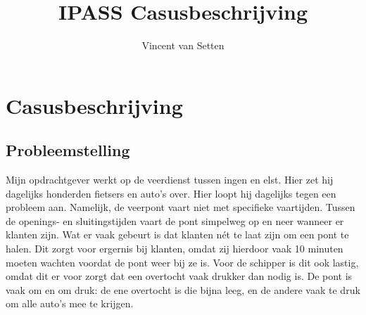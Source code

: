 \documentclass[11pt]{article}
\title{IPASS Casusbeschrijving}
\author{Vincent van Setten}
\begin{document}
\section{Casusbeschrijving}
\subsection{Probleemstelling}
Mijn opdrachtgever werkt op de veerdienst tussen ingen en elst. Hier zet hij dagelijks
honderden fietsers en auto's over. Hier loopt hij dagelijks tegen een probleem aan.
Namelijk, de veerpont vaart niet met specifieke vaartijden. Tussen de openings- en
sluitingstijden vaart de pont simpelweg op en neer wanneer er klanten zijn. Wat er vaak
gebeurt is dat klanten nét te laat zijn om een pont te halen. Dit zorgt voor ergernis bij
klanten, omdat zij hierdoor vaak 10 minuten moeten wachten voordat de pont weer bij
ze is. Voor de schipper is dit ook lastig, omdat dit er voor zorgt dat een overtocht vaak drukker
dan nodig is. De pont is vaak om en om druk: de ene overtocht is die bijna leeg, en de
andere vaak te druk om alle auto’s mee te krijgen.
\end{document}
